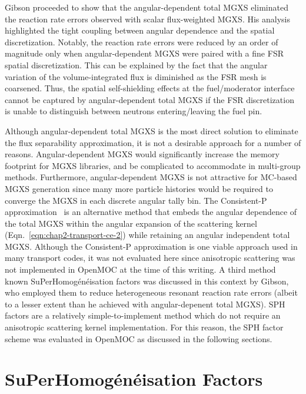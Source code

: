 Gibson proceeded to show that the angular-dependent total \ac{MGXS} eliminated the reaction rate errors observed with scalar flux-weighted \ac{MGXS}. His analysis highlighted the tight coupling between angular dependence and the spatial discretization. Notably, the reaction rate errors were reduced by an order of magnitude only when angular-dependent \ac{MGXS} were paired with a fine \ac{FSR} spatial discretization. This can be explained by the fact that the angular variation of the volume-integrated flux is diminished as the \ac{FSR} mesh is coarsened. Thus, the spatial self-shielding effects at the fuel/moderator interface cannot be captured by angular-dependent total \ac{MGXS} if the \ac{FSR} discretization is unable to distinguish between neutrons entering/leaving the fuel pin.

Although angular-dependent total \ac{MGXS} is the most direct solution to eliminate the flux separability approximation, it is not a desirable approach for a number of reasons. Angular-dependent \ac{MGXS} would significantly increase the memory footprint for \ac{MGXS} libraries, and be complicated to accommodate in multi-group methods. Furthermore, angular-dependent \ac{MGXS} is not attractive for \ac{MC}-based \ac{MGXS} generation since many more particle histories would be required to converge the \ac{MGXS} in each discrete angular tally bin. The Consistent-P approximation~\cite{bell1967transport} is an alternative method that embeds the angular dependence of the total \ac{MGXS} within the angular expansion of the scattering kernel (Eqn.~\ref{eqn:chap2-transport-ce-2}) while retaining an angular independent total \ac{MGXS}. Although the Consistent-P approximation is one viable approach used in many transport codes, it was not evaluated here since anisotropic scattering was not implemented in OpenMOC at the time of this writing. A third method known SuPerHomog\'{e}n\'{e}isation factors was discussed in this context by Gibson, who employed them to reduce heterogeneous resonant reaction rate errors (albeit to a lesser extent than he achieved with angular-depenent total \ac{MGXS}). \ac{SPH} factors are a relatively simple-to-implement method which do not require an anisotropic scattering kernel implementation. For this reason, the \ac{SPH} factor scheme was evaluated in OpenMOC as discussed in the following sections.



\section{SuPerHomog\'{e}n\'{e}isation Factors}
\label{sec:chap6-sph}

